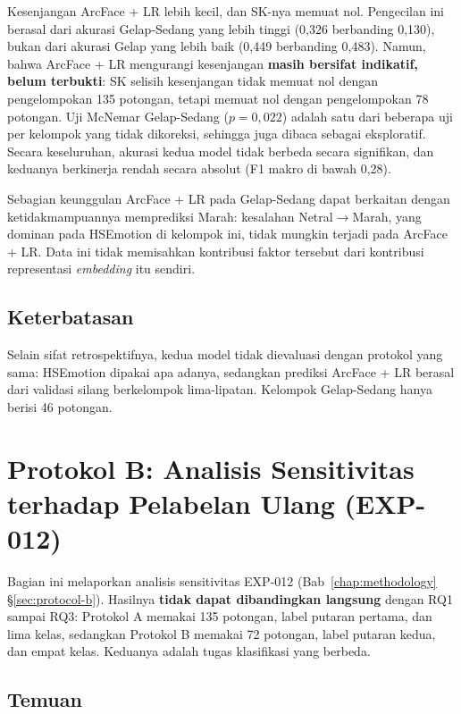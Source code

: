 Kesenjangan ArcFace + LR lebih kecil, dan SK-nya memuat nol. Pengecilan ini berasal dari akurasi Gelap-Sedang yang lebih tinggi (0,326 berbanding 0,130), bukan dari akurasi Gelap yang lebih baik (0,449 berbanding 0,483). Namun, bahwa ArcFace + LR mengurangi kesenjangan \textbf{masih bersifat indikatif, belum terbukti}: SK selisih kesenjangan tidak memuat nol dengan pengelompokan 135 potongan, tetapi memuat nol dengan pengelompokan 78 potongan. Uji McNemar Gelap-Sedang ($p = 0,022$) adalah satu dari beberapa uji per kelompok yang tidak dikoreksi, sehingga juga dibaca sebagai eksploratif. Secara keseluruhan, akurasi kedua model tidak berbeda secara signifikan, dan keduanya berkinerja rendah secara absolut (F1 makro di bawah 0,28).

Sebagian keunggulan ArcFace + LR pada Gelap-Sedang dapat berkaitan dengan ketidakmampuannya memprediksi Marah: kesalahan Netral$\to$Marah, yang dominan pada HSEmotion di kelompok ini, tidak mungkin terjadi pada ArcFace + LR. Data ini tidak memisahkan kontribusi faktor tersebut dari kontribusi representasi \textit{embedding} itu sendiri.

\subsection*{Keterbatasan}

Selain sifat retrospektifnya, kedua model tidak dievaluasi dengan protokol yang sama: HSEmotion dipakai apa adanya, sedangkan prediksi ArcFace + LR berasal dari validasi silang berkelompok lima-lipatan. Kelompok Gelap-Sedang hanya berisi 46 potongan.

\section{Protokol B: Analisis Sensitivitas terhadap Pelabelan Ulang (EXP-012)}
\label{sec:protocol-b-results}

Bagian ini melaporkan analisis sensitivitas EXP-012 (Bab~\ref{chap:methodology} \S\ref{sec:protocol-b}). Hasilnya \textbf{tidak dapat dibandingkan langsung} dengan RQ1 sampai RQ3: Protokol A memakai 135 potongan, label putaran pertama, dan lima kelas, sedangkan Protokol B memakai 72 potongan, label putaran kedua, dan empat kelas. Keduanya adalah tugas klasifikasi yang berbeda.

\subsection*{Temuan}

